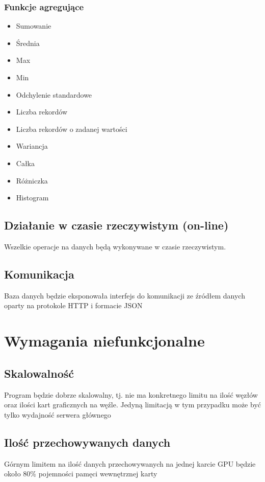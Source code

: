 \documentclass[paper=a4, fontsize=11pt]{scrartcl} %
\numberwithin{equation}{section} %
\numberwithin{figure}{section} %
\numberwithin{table}{section} %
\begin{document}
        \subsubsection{Funkcje agregujące}
        \begin{itemize}
            \item Sumowanie
            \item Średnia
            \item Max
            \item Min
            \item Odchylenie standardowe
            \item Liczba rekordów
            \item Liczba rekordów o zadanej wartości
            \item Wariancja
            \item Całka
            \item Różniczka
            \item Histogram
        \end{itemize}
    \subsection{Działanie w czasie rzeczywistym (on-line)}
    Wszelkie operacje na danych będą wykonywane w czasie rzeczywistym.
    \subsection{Komunikacja}
    Baza danych będzie eksponowała interfejs do komunikacji ze źródłem danych oparty na protokole HTTP i formacie JSON
\section{Wymagania niefunkcjonalne}
    \subsection{Skalowalność}
    Program będzie dobrze skalowalny, tj. nie ma konkretnego limitu na ilość węzłów oraz ilości kart graficznych na węźle. Jedyną limitacją w tym przypadku może być tylko wydajność serwera głównego
    \subsection{Ilość przechowywanych danych}
    Górnym limitem na ilość danych przechowywanych na jednej karcie GPU będzie około 80\% pojemności pamęci wewnętrznej karty
\end{document}
